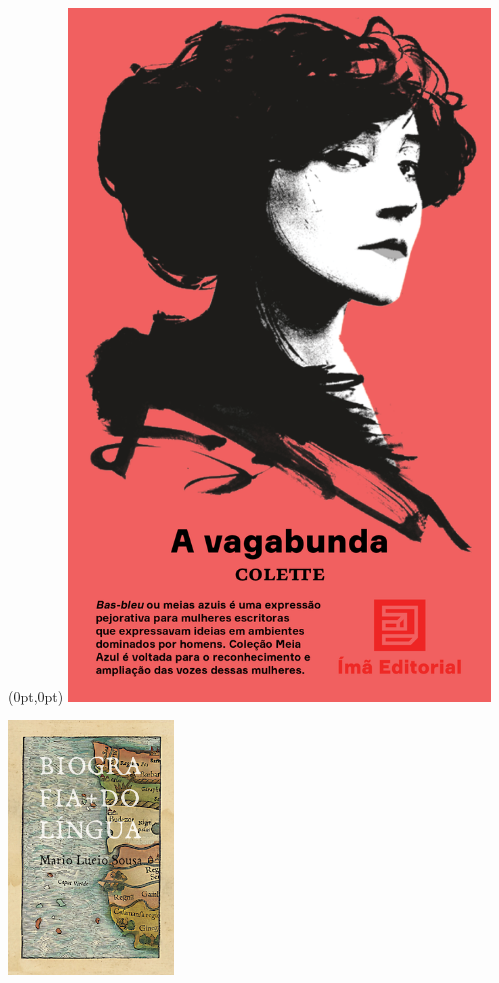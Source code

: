 \pagestyle{ima}
\label{ima}

\begin{textblock*}{5.625in}(0pt,0pt)%
\vspace*{-1.45cm}
\hspace*{-1.2cm}\includegraphics*[width=112mm]{./imgs/IMA.png}
\end{textblock*}

\pagebreak

\hspace{.5cm}

\begin{center}
\hspace*{-.5cm}\includegraphics[width=44mm]{./imgs/lingua.jpg}
\end{center}

